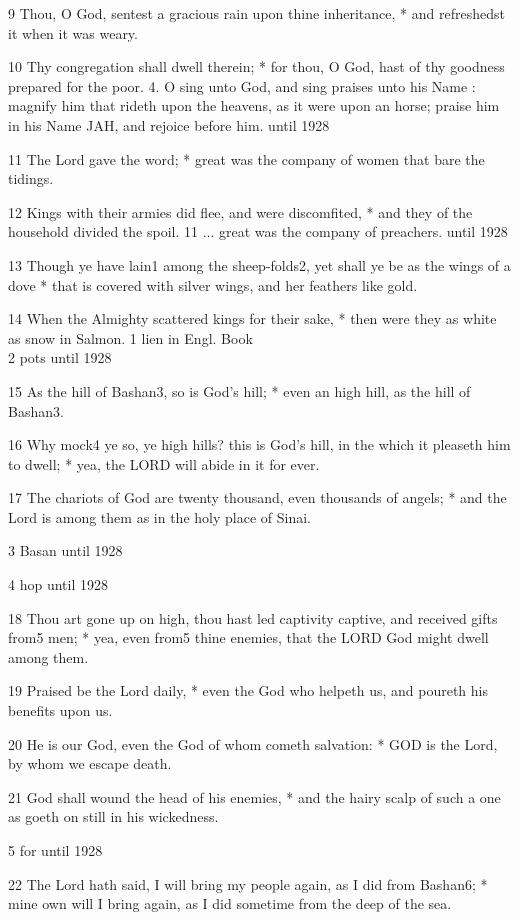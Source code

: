 9 Thou, O God, sentest a gracious rain upon thine inheritance,
* and refreshedst it when it was weary.

10 Thy congregation shall dwell therein; * for thou,
O God, hast of thy goodness prepared for the poor. 4. O sing unto God, and sing
praises unto his Name : magnify him that rideth upon the heavens, as it
were upon an horse; praise him in his Name JAH, and rejoice before him.
until
1928

11 The Lord gave the word; * great was the company of women that bare the
tidings.

12 Kings with their armies did flee, and were discomfited,
* and they of the household divided the spoil. 11 ... great was the company
of preachers.
until 1928

13 Though ye have lain1 among the sheep-folds2, yet
shall ye be as the wings of a dove * that is covered with silver wings,
and her feathers like gold.

14 When the Almighty scattered kings for their sake,
* then were they as white as snow in Salmon. 1 lien in
Engl. Book\\
2 pots
until 1928

15 As the hill of Bashan3, so is God's hill; * even an high hill,
as the hill of Bashan3.

16 Why mock4 ye so, ye high hills? this is
God's hill, in the which it pleaseth him to dwell; * yea, the LORD will
abide in it for ever.

17 The chariots of God are twenty thousand, even thousands
of angels; * and the Lord is among them as in the holy place of Sinai.

3 Basan
until 1928

4 hop
until 1928

18 Thou art gone up on high, thou hast led captivity captive, and received
gifts from5 men; * yea, even from5 thine enemies,
that the LORD God might dwell among them.

19 Praised be the Lord daily, * even the God who helpeth
us, and poureth his benefits upon us.

20 He is our God, even the God of whom cometh salvation:
* GOD is the Lord, by whom we escape death.

21 God shall wound the head of his enemies, * and the
hairy scalp of such a one as goeth on still in his wickedness.

5 for
until 1928

22 The Lord hath said, I will bring my people again, as I did from Bashan6;
* mine own will I bring again, as I did sometime from the deep of the sea.

